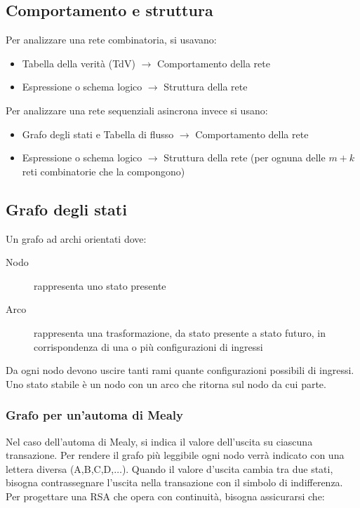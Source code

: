 \documentclass{subfiles}
\begin{document}
\subsection{Comportamento e struttura}

Per analizzare una rete combinatoria, si usavano:

\begin{itemize}
    \item Tabella della verità (TdV) $\to$ Comportamento della rete
    \item Espressione o schema logico $\to$ Struttura della rete
\end{itemize}

\noindent
Per analizzare una rete sequenziali asincrona invece si usano:

\begin{itemize}
    \item Grafo degli stati e Tabella di flusso $\to$ Comportamento della rete
    \item Espressione o schema logico $\to$ Struttura della rete (per ognuna delle $m+k$ reti combinatorie che la compongono)
\end{itemize}

\subsection{Grafo degli stati}

Un grafo ad archi orientati dove:

\begin{description}
    \item[Nodo] rappresenta uno stato presente
    \item[Arco] rappresenta una trasformazione, da stato presente a stato futuro, in corrispondenza di una o più configurazioni di ingressi
\end{description}

\noindent
Da ogni nodo devono uscire tanti rami quante configurazioni possibili di ingressi.
Uno stato stabile è un nodo con un arco che ritorna sul nodo da cui parte.

\subsubsection{Grafo per un'automa di Mealy}

Nel caso dell'automa di Mealy, si indica il valore dell'uscita su ciascuna transazione.
Per rendere il grafo più leggibile ogni nodo verrà indicato con una lettera diversa (A,B,C,D,$\dots$).
Quando il valore d'uscita cambia tra due stati, bisogna contrassegnare l'uscita nella transazione con il simbolo di indifferenza. Per progettare una RSA che opera con continuità, bisogna assicurarsi che:
\end{document}
